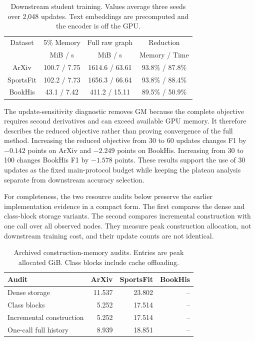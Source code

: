 \begin{table}[H]
\centering
\scriptsize
\setlength{\tabcolsep}{2pt}
\caption{Downstream student training. Values average three seeds over 2,048 updates. Text embeddings are precomputed and the encoder is off the GPU.}
\label{tab:student_resource_audit}
\begin{tabular}{cccc}
\toprule
Dataset & 5\% Memory & Full raw graph & Reduction\\
 & MiB / s & MiB / s & Memory / Time\\
\midrule
ArXiv & 100.7 / 7.75 & 1614.6 / 63.61 & 93.8\% / 87.8\%\\
SportsFit & 102.2 / 7.73 & 1656.3 / 66.64 & 93.8\% / 88.4\%\\
BookHis & 43.1 / 7.42 & 411.2 / 15.11 & 89.5\% / 50.9\%\\
\bottomrule
\end{tabular}
\end{table}

The update-sensitivity diagnostic removes GM because the complete objective
requires second derivatives and can exceed available GPU memory. It therefore
describes the reduced objective rather than proving convergence of the full
method. Increasing the reduced objective from 30 to 60 updates changes F1 by
$-0.142$ points on ArXiv and $-2.249$ points on BookHis. Increasing from 30 to
100 changes BookHis F1 by $-1.578$ points. These results support the use of 30
updates as the fixed main-protocol budget while keeping the plateau analysis
separate from downstream accuracy selection.

For completeness, the two resource audits below preserve the earlier
implementation evidence in a compact form. The first compares the dense and
class-block storage variants. The second compares incremental construction
with one call over all observed nodes. They measure peak construction
allocation, not downstream training cost, and their update counts are not
identical.

\begin{table}[H]
\centering
\scriptsize
\setlength{\tabcolsep}{2.5pt}
\caption{Archived construction-memory audits. Entries are peak allocated
GiB. Class blocks include cache offloading.}
\label{tab:compact_memory}
\begin{tabular*}{\linewidth}{@{\extracolsep{\fill}}lrrr@{}}
\toprule
Audit & ArXiv & SportsFit & BookHis\\
\midrule
Dense storage & 11.537 & 23.802 & --\\
Class blocks & 5.252 & 17.514 & --\\
Incremental construction & 5.252 & 17.514 & --\\
One-call full history & 8.939 & 18.851 & --\\
\bottomrule
\end{tabular*}
\end{table}

